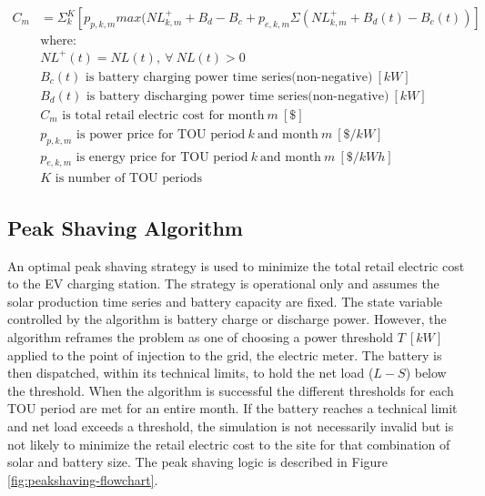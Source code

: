 \documentclass[journal,article,submit,pdftex,moreauthors]{Definitions/mdpi}
\begin{document}
\begin{equation}
  \label{eq:cost}
  \begin{split}
    C_m & = \Sigma_k^K [ p_{p,k,m} max(NL^+_{k,m} + B_d - B_c + p_{e,k,m} \Sigma (NL^+_{k,m} + B_d(t) - B_c(t)) ] \\
        & \text{where:}                                                                                           \\
        & NL^+(t) = NL(t),\ \forall\ NL(t)>0                                                                      \\
        & B_c(t) \text{ is battery charging power time series(non-negative)}\ [kW]                                \\
        & B_d(t) \text{ is battery discharging power time series(non-negative)}\ [kW]                             \\
        & C_m \text{ is total retail electric cost for month}\ m\ [\$]                                            \\
        & p_{p,k,m} \text{ is power price for TOU period}\ k\ \text{and month}\ m\  [\$/kW]                       \\
        & p_{e,k,m} \text{ is energy price for TOU period}\ k\ \text{and month}\ m\ [\$/kWh]                      \\
        & K \text{ is number of TOU periods}
  \end{split}
\end{equation}

\subsection{Peak Shaving Algorithm}\label{peak-shaving-algorithm}%

An optimal peak shaving strategy is used to minimize the total retail electric cost to the EV charging station. The strategy is operational only and assumes the solar production time series and battery capacity are fixed. The state variable controlled by the algorithm is battery charge or discharge power. However, the algorithm reframes the problem as one of choosing a power threshold \(T\ [kW]\) applied to the point of injection to the grid, the electric meter. The battery is then dispatched, within its technical limits, to hold the net load ($L-S$) below the threshold. When the algorithm is successful the different thresholds for each TOU period are met for an entire month. If the battery reaches a technical limit and net load exceeds a threshold, the simulation is not necessarily invalid but is not likely to minimize the retail electric cost to the site for that combination of solar and battery size. The peak shaving logic is described in Figure \ref{fig:peakshaving-flowchart}.
\end{document}

